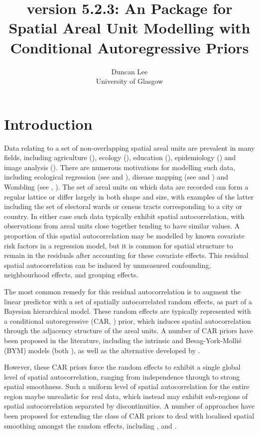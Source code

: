 \documentclass[article,shortnames,nojss]{jss}
\author{Duncan Lee\\University of Glasgow }
\title{\pkg{CARBayes} version 5.2.3: An \proglang{R} Package for Spatial Areal Unit Modelling  with Conditional Autoregressive Priors}
\begin{document}






\section{Introduction}
Data relating to a set of non-overlapping spatial areal units are prevalent in many fields, including agriculture (\cite{besag1999}), ecology (\cite{brewer2007}), education (\cite{wall2004}), epidemiology (\cite{lee2011}) and image analysis (\cite{gavin1997}).  There are numerous motivations for modelling such data, including ecological regression  (see \cite{wakefield2007} and \cite{lee2009}), disease mapping (see \cite{green2002} and \cite{lee2011}) and Wombling (see \cite{lu2007}, \cite{ma2007}). The set of areal units on which data are recorded can form a regular lattice or differ largely in both shape and size, with examples of the latter including the set of electoral wards or census tracts corresponding to a city or country. In either case such data typically exhibit spatial autocorrelation, with observations from areal units close together tending to have similar values. A proportion of this spatial autocorrelation may be modelled by known covariate risk factors in a regression model, but it is common for  spatial structure to remain in the residuals after accounting for these covariate effects. This residual spatial autocorrelation can be induced by unmeasured confounding, neighbourhood effects, and grouping effects.

\hspace{1cm} The most common remedy for this residual autocorrelation is to augment the linear predictor with a set of spatially autocorrelated random effects, as part of a Bayesian hierarchical model. These random effects are typically represented with a conditional autoregressive (CAR, \cite{besag1991}) prior,  which induces spatial autocorrelation through the adjacency structure of the areal units. A number of CAR priors have been proposed in the literature, including the intrinsic and Besag-York-Molli\'{e} (BYM) models (both \cite{besag1991}), as well as the alternative  developed by \cite{leroux2000}. 

\hspace{1cm} However, these CAR priors force the random effects to exhibit a single global level of spatial autocorrelation, ranging from independence through to strong spatial smoothness. Such a uniform level of spatial autocorrelation for the entire region maybe unrealistic for real data, which instead may exhibit sub-regions of spatial autocorrelation separated by discontinuities. A number of approaches have been proposed for extending the class of CAR priors to deal with localised spatial smoothing amongst the random effects, including \cite{lee2012}, and \cite{lee2015}.
\end{document}
